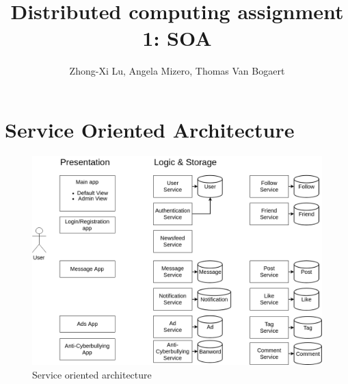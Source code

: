 \documentclass{article}
\title{Distributed computing assignment 1: SOA}
\author{Zhong-Xi Lu, Angela Mizero, Thomas Van Bogaert}
\date{}
\begin{document}
\maketitle

\section{Service Oriented Architecture}

\begin{figure}[H]
    \centering
    \includegraphics[width=\textwidth]{DC.png}
    \caption{Service oriented architecture}
    \label{soa}
\end{figure}
\end{document}
